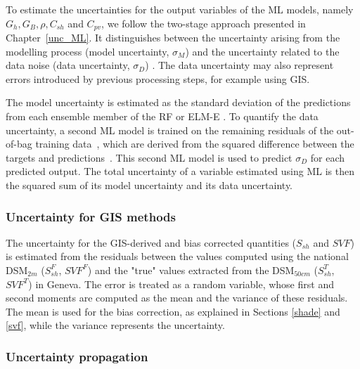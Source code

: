 To estimate the uncertainties for the output variables of the ML models, namely $G_h, G_B, \rho, C_{sh}$ and $C_{pv}$, we follow the two-stage approach presented in Chapter~\ref{unc_ML}. 
It distinguishes between the uncertainty arising from the modelling process (model uncertainty, $\sigma_M$) and the uncertainty related to the data noise (data uncertainty, $\sigma_D$) \cite{wan_probabilistic_2014}. 
The data uncertainty may also represent errors introduced by previous processing steps, for example using GIS. 

The model uncertainty is estimated as the standard deviation of the predictions from each ensemble member of the RF or ELM-E \cite{heskes_practical_1997, wan_probabilistic_2014}. 
To quantify the data uncertainty, a second ML model is trained on the remaining residuals of the out-of-bag training data~\cite{breiman_bagging_1996}, which are derived from the squared difference between the targets and predictions~\cite{heskes_practical_1997, wan_probabilistic_2014}. This second ML model is used to predict $\sigma_D$ for each predicted output.
The total uncertainty of a variable estimated using ML is then the squared sum of its model uncertainty and its data uncertainty.

\subsubsection{Uncertainty for GIS methods}

The uncertainty for the GIS-derived and bias corrected quantities ($S_{sh}$ and $SVF$) is estimated from the residuals between the values computed using the national DSM$_{2m}$ ($S_{sh}^F$, $SVF^F$) and the "true" values extracted from the DSM$_{50cm}$ ($S_{sh}^T$, $SVF^T$) in Geneva.
The error is treated as a random variable, whose first and second moments are computed as the mean and the variance of these residuals. The mean is used for the bias correction, as explained in Sections \ref{shade} and \ref{svf}, while the variance represents the uncertainty.

\subsubsection{Uncertainty propagation}
\label{unc_prop}

